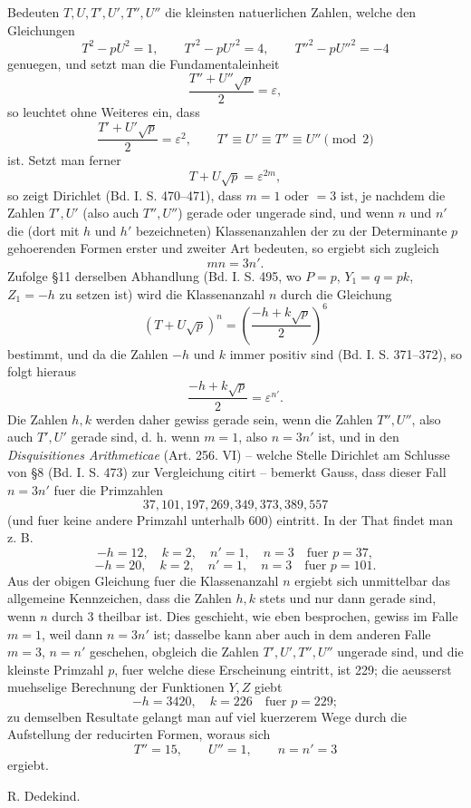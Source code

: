 \documentclass[11pt]{article}
\newcommand{\sign}[1]{\begin{flushright}#1\end{flushright}}
\begin{document}
Bedeuten \(T,U,T',U',T'',U''\) die kleinsten natuerlichen Zahlen, welche den Gleichungen
\[
T^2-pU^2=1,
\qquad
T'^2-pU'^2=4,
\qquad
T''^2-pU''^2=-4
\]
genuegen, und setzt man die Fundamentaleinheit
\[
\frac{T''+U''\sqrt p}{2}=\varepsilon,
\]
so leuchtet ohne Weiteres ein, dass
\[
\frac{T'+U'\sqrt p}{2}=\varepsilon^2,
\qquad
T'\equiv U'\equiv T''\equiv U''\pmod 2
\]
ist. Setzt man ferner
\[
T+U\sqrt p=\varepsilon^{2m},
\]
so zeigt Dirichlet (Bd. I. S. 470--471), dass \(m=1\) oder \(=3\) ist, je nachdem die Zahlen \(T',U'\) (also auch \(T'',U''\)) gerade oder ungerade sind, und wenn \(n\) und \(n'\) die (dort mit \(h\) und \(h'\) bezeichneten) Klassenanzahlen der zu der Determinante \(p\) gehoerenden Formen erster und zweiter Art bedeuten, so ergiebt sich zugleich
\[
mn=3n'.
\]
Zufolge \S 11 derselben Abhandlung (Bd. I. S. 495, wo \(P=p\), \(Y_1=q=pk\), \(Z_1=-h\) zu setzen ist) wird die Klassenanzahl \(n\) durch die Gleichung
\[
(T+U\sqrt p)^n=
\left(\frac{-h+k\sqrt p}{2}\right)^6
\]
bestimmt, und da die Zahlen \(-h\) und \(k\) immer positiv sind (Bd. I. S. 371--372), so folgt hieraus
\[
\frac{-h+k\sqrt p}{2}=\varepsilon^{n'}.
\]
Die Zahlen \(h,k\) werden daher gewiss gerade sein, wenn die Zahlen \(T'',U''\), also auch \(T',U'\) gerade sind, d. h. wenn \(m=1\), also \(n=3n'\) ist, und in den \emph{Disquisitiones Arithmeticae} (Art. 256. VI) -- welche Stelle Dirichlet am Schlusse von \S 8 (Bd. I. S. 473) zur Vergleichung citirt -- bemerkt Gauss, dass dieser Fall \(n=3n'\) fuer die Primzahlen
\[
37,101,197,269,349,373,389,557
\]
(und fuer keine andere Primzahl unterhalb 600) eintritt. In der That findet man z. B.
\[
-h=12,\quad k=2,\quad n'=1,\quad n=3\quad \text{fuer }p=37,
\]
\[
-h=20,\quad k=2,\quad n'=1,\quad n=3\quad \text{fuer }p=101.
\]
Aus der obigen Gleichung fuer die Klassenanzahl \(n\) ergiebt sich unmittelbar das allgemeine Kennzeichen, dass die Zahlen \(h,k\) stets und nur dann gerade sind, wenn \(n\) durch 3 theilbar ist. Dies geschieht, wie eben besprochen, gewiss im Falle \(m=1\), weil dann \(n=3n'\) ist; dasselbe kann aber auch in dem anderen Falle \(m=3\), \(n=n'\) geschehen, obgleich die Zahlen \(T',U',T'',U''\) ungerade sind, und die kleinste Primzahl \(p\), fuer welche diese Erscheinung eintritt, ist 229; die aeusserst muehselige Berechnung der Funktionen \(Y,Z\) giebt
\[
-h=3420,\quad k=226\quad \text{fuer }p=229;
\]
zu demselben Resultate gelangt man auf viel kuerzerem Wege durch die Aufstellung der reducirten Formen, woraus sich
\[
T''=15,
\qquad
U''=1,
\qquad
n=n'=3
\]
ergiebt.
\sign{R. Dedekind.}
\end{document}
